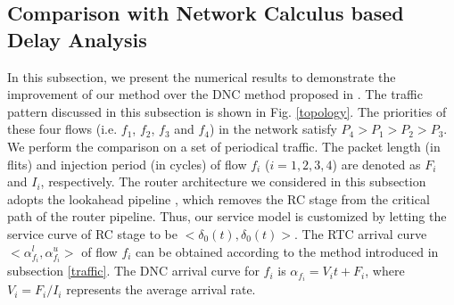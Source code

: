 \documentclass[preprint]{elsarticle}
\begin{document}
\subsection{Comparison with Network Calculus based Delay Analysis}\label{dnccmp}
In this subsection, we present the numerical results to demonstrate the improvement of our method over the DNC method proposed in \cite{Qian489900}. The traffic pattern discussed in this subsection is shown in Fig. \ref{topology}. The priorities of these four flows (i.e. $f_1$, $f_2$, $f_3$ and $f_4$) in the network satisfy $P_4>P_1>P_2>P_3$. We perform the comparison on a set of periodical traffic. The packet length (in flits) and injection period (in cycles) of flow $f_i$ ($i=1,2,3,4$) are denoted as $F_i$ and $I_i$, respectively. The router architecture we considered in this subsection adopts the lookahead pipeline \cite{jerger2009chip}, which removes the RC stage from the critical path of the router pipeline. Thus, our service model is customized by letting the service curve of RC stage to be $<\delta_0(t),\delta_0(t)>$. The RTC arrival curve $<\alpha_{f_i}^l,\alpha_{f_i}^u>$ of flow $f_i$ can be obtained according to the method introduced in subsection \ref{traffic}. The DNC arrival curve for $f_i$ is $\alpha_{f_i}=V_i t+F_i$, where $V_i=F_i/I_i$ represents the average arrival rate. 
\end{document}
